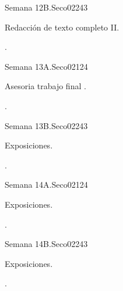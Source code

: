 \begin{syllabus}
\begin{unit}{Semana 12B.}{}{Seco02}{24}{3}
   \begin{topics}
      \item Redacción de texto completo  II.
   \end{topics}

   \begin{learningoutcomes}
      \item .
      \end{learningoutcomes}
\end{unit}

\begin{unit}{Semana 13A.}{}{Seco02}{12}{4}
   \begin{topics}
      \item Asesoria trabajo final .
   \end{topics}
   \begin{learningoutcomes}
      \item .
   \end{learningoutcomes}
\end{unit}

\begin{unit}{Semana 13B.}{}{Seco02}{24}{3}
   \begin{topics}
      \item Exposiciones.
   \end{topics}

   \begin{learningoutcomes}
      \item .
      \end{learningoutcomes}
\end{unit}

\begin{unit}{Semana 14A.}{}{Seco02}{12}{4}
   \begin{topics}
      \item Exposiciones.
   \end{topics}
   \begin{learningoutcomes}
      \item .
   \end{learningoutcomes}
\end{unit}

\begin{unit}{Semana 14B.}{}{Seco02}{24}{3}
   \begin{topics}
      \item Exposiciones.
   \end{topics}

   \begin{learningoutcomes}
      \item .
      \end{learningoutcomes}
\end{unit}


\end{syllabus}
